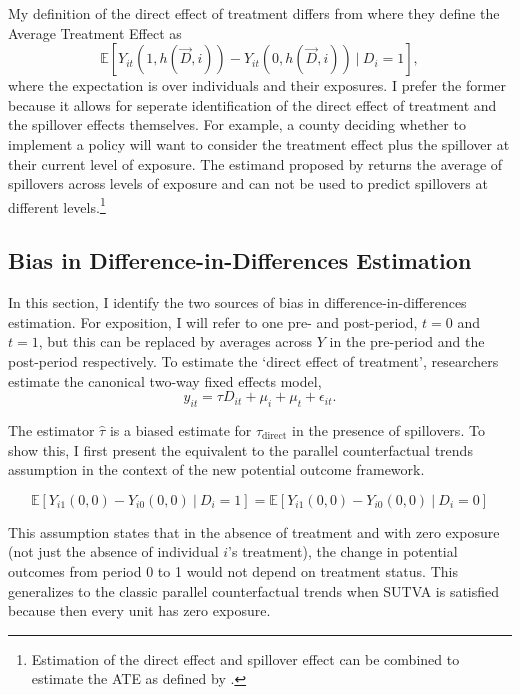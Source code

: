 \documentclass[11pt]{article}
\begin{document}
My definition of the direct effect of treatment differs from \citet{Sävje_Aronow_Hudgens_2019} where they define the Average Treatment Effect as \[ 
    \mathbb{E} \left[ Y_{it}(1, h(\vec{D}, i)) - Y_{it}(0, h(\vec{D}, i)) \ \vert \ D_i = 1 \right],
\] 
where the expectation is over individuals and their exposures. I prefer the former because it allows for seperate identification of the direct effect of treatment and the spillover effects themselves. For example, a county deciding whether to implement a policy will want to consider the treatment effect plus the spillover at their current level of exposure. The estimand proposed by \citet{Sävje_Aronow_Hudgens_2019} returns the average of spillovers across levels of exposure and can not be used to predict spillovers at different levels.\footnote{Estimation of the direct effect and spillover effect can be combined to estimate the ATE as defined by \citet{Sävje_Aronow_Hudgens_2019}.}


\subsection{Bias in Difference-in-Differences Estimation}

In this section, I identify the two sources of bias in difference-in-differences estimation. For exposition, I will refer to one pre- and post-period, $t = 0$ and $t = 1$, but this can be replaced by averages across $Y$ in the pre-period and the post-period respectively. To estimate the `direct effect of treatment', researchers estimate the canonical two-way fixed effects model, 
\begin{equation}\label{eq:twfe}    
    y_{it} = \tau D_{it} + \mu_i + \mu_t + \epsilon_{it}.
\end{equation}

The estimator $\hat{\tau}$ is a biased estimate for $\tau_{\text{direct}}$ in the presence of spillovers. To show this, I first present the equivalent to the parallel counterfactual trends assumption in the context of the new potential outcome framework. 

\begin{assumption}\label{parallel}
    \[ 
        \mathbb{E}\left[ Y_{i1}(0, 0) - Y_{i0}(0, 0) \ \vert \ D_i = 1 \right] = 
        \mathbb{E}\left[ Y_{i1}(0, 0) - Y_{i0}(0, 0) \ \vert \ D_i = 0 \right]
    \]
\end{assumption}
This assumption states that in the absence of treatment and with zero exposure (not just the absence of individual $i$'s treatment), the change in potential outcomes from period 0 to 1 would not depend on treatment status. This generalizes to the classic parallel counterfactual trends when SUTVA is satisfied because then every unit has zero exposure.
\end{document}
